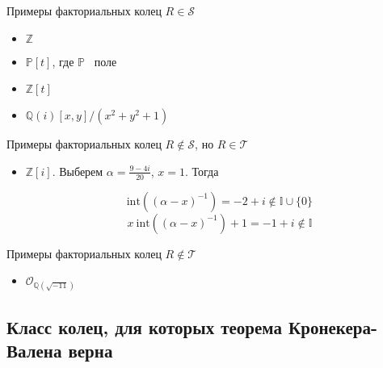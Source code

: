 \documentclass[8pt, xcolor=x11names]{beamer}
\begin{document}
\begin{frame}
    \begin{block}{Примеры факториальных колец $R \in \mathcal{S}$}
        \begin{itemize}
            \item $\mathbb{Z}$
            
            \item $\mathbb{P}[t]$, где $\mathbb{P}$ \textendash\ поле
            
            \item $\mathbb{Z}[t]$
            
            \item $\mathbb{Q}(i)[x, y]/(x^2 + y^2 + 1)$
        \end{itemize}
    \end{block}
    
    \begin{block}{Примеры факториальных колец $R \not\in \mathcal{S}$, но $R \in \mathcal{T}$}
        \begin{itemize}
            \item $\mathbb{Z}[i]$.
            Выберем $\alpha=\frac{9-4i}{20}$, $x=1$.
            Тогда
            
            $$
                \textrm{int}((\alpha-x)^{-1})=-2+i \notin \mathbb{I} \cup \{0\}
            $$
            $$
                x \ \textrm{int}((\alpha-x)^{-1})+1=-1+i \notin \mathbb{I}
            $$
        \end{itemize}
    \end{block}
    
    \begin{block}{Примеры факториальных колец $R \not\in \mathcal{T}$}
        \begin{itemize}
            \item $\mathcal{O}_{\mathbb{Q}(\sqrt{-11})}$
        \end{itemize}
    \end{block}
\end{frame}

\subsection{Класс колец, для которых теорема Кронекера-Валена верна}
\end{document}
